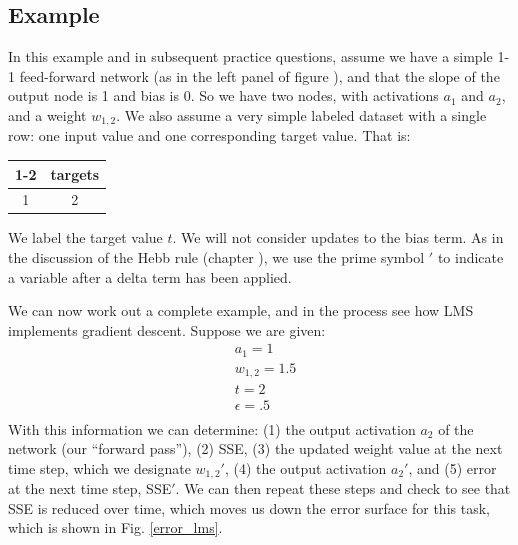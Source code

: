 
\subsection{Example}\label{lms_example}

In this example and in subsequent practice questions, assume we have a  simple 1-1 feed-forward network  (as in the left panel of figure ), and that the slope of the output node is 1 and bias is 0. So we have two nodes, with activations $a_1$ and $a_2$, and a weight $w_{1,2}$. We also assume a very simple labeled dataset with a single row: one input value and one corresponding target value. That is:
\begin{center}
\begin{tabular}{| c || c | }
\cline{1-2}
\multicolumn{1}{| c || }{inputs}
 & \multicolumn{1}{c|}{targets} \\
\hline
  1 & 2  \\
\hline
\end{tabular}
\end{center}
We label the target value $t$. We will not consider updates to the bias term. As in the discussion of the Hebb rule (chapter ), we use the prime symbol $'$ to indicate a variable after a delta term has been applied.

We can now work out a complete example, and in the process see how LMS implements gradient descent. Suppose we are given:
\begin{eqnarray*}
& a_1 = 1 \\
& w_{1,2} = 1.5 \\
& t = 2  \\
& \epsilon = .5  \\
\end{eqnarray*}
With this information we can determine: (1) the output activation $a_2$ of the network (our ``forward pass''), (2) SSE, (3) the updated weight value at the next time step, which we designate $w_{1,2}'$, (4) the output activation $a_2'$, and (5) error at the next time step, SSE$'$. We can then repeat these steps and check to see that SSE is reduced over time, which moves us down the error surface for this task, which is shown in Fig. \ref{error_lms}.

